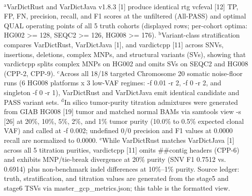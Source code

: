 \begin{table}[htbp]
\\[4pt]\footnotesize{$^{\text{a}}$VarDictRust and VarDictJava v1.8.3 [1] produce identical rtg vcfeval [12] TP, FP, FN, precision, recall, and F1 scores at the unfiltered (All-PASS) and optimal QUAL operating points of all 5 truth cohorts (displayed rows; per-cohort optima: HG002 \textgreater{}= 128, SEQC2 \textgreater{}= 126, HG008 \textgreater{}= 176). $^{\text{b}}$Variant-class stratification compares VarDictRust, VarDictJava [1], and vardictcpp [11] across SNVs, insertions, deletions, complex MNPs, and structural variants (SVs), showing that vardictcpp splits complex MNPs on HG002 and omits SVs on SEQC2 and HG008 (CPP-2, CPP-9). $^{\text{c}}$Across all 18/18 targeted Chromosome 20 somatic noise-floor runs (6 HG008 platforms x 3 low-VAF regimes: -f 0.01 -r 2, -f 0 -r 2, and singleton -f 0 -r 1), VarDictRust and VarDictJava emit identical candidate and PASS variant sets. $^{\text{d}}$In silico tumor-purity titration admixtures were generated from GIAB HG008 [19] tumor and matched normal BAMs via samtools view -s [26] at 20\%, 10\%, 5\%, 2\%, and 1\% tumor purity (10.0\% to 0.5\% expected clonal VAF) and called at -f 0.002; undefined 0/0 precision and F1 values at 0.0000 recall are normalized to 0.0000. $^{\text{e}}$While VarDictRust matches VarDictJava [1] across all 5 titration purities, vardictcpp [11] omits \#\#contig headers (CPP-6) and exhibits MNP/tie-break divergence at 20\% purity (SNV F1 0.7512 vs. 0.6914) plus non-benchmark indel differences at 10\%--1\% purity. Source ledger: truth, stratification, and titration values are generated from the stage5 and stage6 TSVs via master\_gcp\_metrics.json; this table is the formatted view.}
\end{table}
